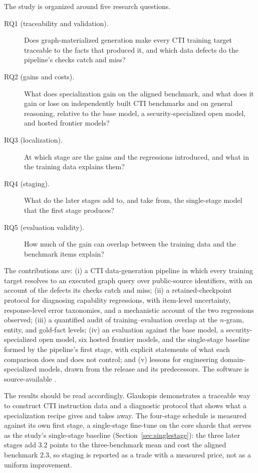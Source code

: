 \documentclass[twocolumn]{svjour3}
\begin{document}
The study is organized around five research questions.
\begin{description}
\item[RQ1 (traceability and validation).] Does graph-materialized generation make every CTI training target traceable to the facts that produced it, and which data defects do the pipeline's checks catch and miss?
\item[RQ2 (gains and costs).] What does specialization gain on the aligned benchmark, and what does it gain or lose on independently built CTI benchmarks and on general reasoning, relative to the base model, a security-specialized open model, and hosted frontier models?
\item[RQ3 (localization).] At which stage are the gains and the regressions introduced, and what in the training data explains them?
\item[RQ4 (staging).] What do the later stages add to, and take from, the single-stage model that the first stage produces?
\item[RQ5 (evaluation validity).] How much of the gain can overlap between the training data and the benchmark items explain?
\end{description}

The contributions are: (i) a CTI data-generation pipeline in which every training target resolves to an executed graph query over public-source identifiers, with an account of the defects its checks catch and miss; (ii) a retained-checkpoint protocol for diagnosing capability regressions, with item-level uncertainty, response-level error taxonomies, and a mechanistic account of the two regressions observed; (iii) a quantified audit of training--evaluation overlap at the $n$-gram, entity, and gold-fact levels; (iv) an evaluation against the base model, a security-specialized open model, six hosted frontier models, and the single-stage baseline formed by the pipeline's first stage, with explicit statements of what each comparison does and does not control; and (v) lessons for engineering domain-specialized models, drawn from the release and its predecessors. The software is source-available \cite{glaukopis2026software}.

The results should be read accordingly. Glaukopis demonstrates a traceable way to construct CTI instruction data and a diagnostic protocol that shows what a specialization recipe gives and takes away. The four-stage schedule is measured against its own first stage, a single-stage fine-tune on the core shards that serves as the study's single-stage baseline (Section~\ref{sec:singlestage}): the three later stages add 3.2 points to the three-benchmark mean and cost the aligned benchmark 2.3, so staging is reported as a trade with a measured price, not as a uniform improvement.
\end{document}
